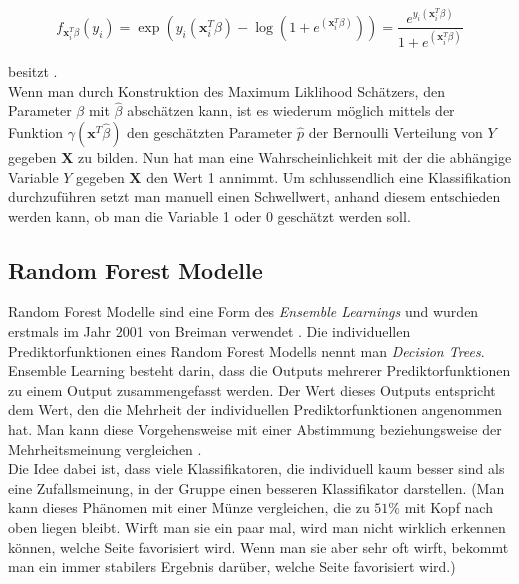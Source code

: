 $$ f_{\mathbf{x}_i^T\beta}(y_i) = \exp( y_i(\mathbf{x}_i^T\beta) - \log(1 + e^{(\mathbf{x}_i^T\beta)})) = \frac{e^{y_i(\mathbf{x}_i^T\beta)}}{1 + e^{(\mathbf{x}_i^T\beta)}}$$

besitzt \cite[Seite 223]{wasserman}. \\ %

Wenn man durch Konstruktion des Maximum Liklihood Sch\"atzers, den Parameter $\beta$ mit $\hat{\beta}$ absch\"atzen kann, ist es wiederum m\"oglich mittels der Funktion $\gamma(\mathbf{x}^T\hat{\beta})$
den gesch\"atzten Parameter $\hat{p}$ der Bernoulli Verteilung von $Y$ gegeben $\mathbf{X}$ zu bilden. Nun hat man eine Wahrscheinlichkeit mit der die abh\"angige Variable $Y$ gegeben $\mathbf{X}$ den Wert 1 annimmt.
Um schlussendlich eine Klassifikation durchzuf\"uhren setzt man manuell einen Schwellwert, anhand diesem entschieden werden kann, ob man die Variable 1 oder 0 gesch\"atzt werden soll.
























\subsection{Random Forest Modelle}
Random Forest Modelle sind eine Form des \textit{Ensemble Learnings} und wurden erstmals im Jahr 2001 von Breiman verwendet \cite{breiman2001random}.
Die individuellen Prediktorfunktionen eines Random
Forest Modells nennt man \textit{Decision Trees}.
Ensemble Learning besteht darin, dass die Outputs mehrerer Prediktorfunktionen zu einem Output zusammengefasst werden. Der Wert dieses Outputs entspricht
dem Wert, den die Mehrheit der individuellen Prediktorfunktionen angenommen hat.
Man kann diese Vorgehensweise mit einer Abstimmung beziehungsweise der Mehrheitsmeinung vergleichen \cite[Seiten 189 bis 191]{handson}. \\

Die Idee dabei ist, dass viele Klassifikatoren, die individuell kaum besser sind als eine Zufallsmeinung, in der Gruppe einen
besseren Klassifikator darstellen. (Man kann dieses Ph\"anomen mit einer M\"unze vergleichen, die zu $51\%$ mit Kopf nach oben liegen bleibt. Wirft
man sie ein paar mal, wird man nicht wirklich erkennen k\"onnen, welche Seite favorisiert wird. Wenn man sie aber sehr oft wirft, bekommt man
ein immer stabilers Ergebnis dar\"uber, welche Seite favorisiert wird.) \\

